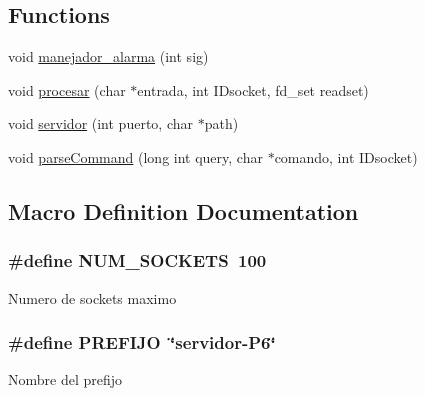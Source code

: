 \subsection*{Functions}
\begin{DoxyCompactItemize}
\item 
void \hyperlink{_g-2361-06-_p1-_server_8h_ad27ad83298aac3580deda730e80a62f0}{manejador\+\_\+alarma} (int sig)
\item 
void \hyperlink{_g-2361-06-_p1-_server_8h_a3053755c82b5168bea9d848b1284f3ca}{procesar} (char $\ast$entrada, int I\+Dsocket, fd\+\_\+set readset)
\item 
void \hyperlink{_g-2361-06-_p1-_server_8h_ae168ee6fdf31fd5ed7d49d45b89a65ed}{servidor} (int puerto, char $\ast$path)
\item 
void \hyperlink{_g-2361-06-_p1-_server_8h_ab7e145be74e8922987621cd01b8d446e}{parse\+Command} (long int query, char $\ast$comando, int I\+Dsocket)
\end{DoxyCompactItemize}


\subsection{Macro Definition Documentation}
\hypertarget{_g-2361-06-_p1-_server_8h_a1c803e4ececfb47d2791c9283c85eb00}{}
\subsubsection[{N\+U\+M\+\_\+\+S\+O\+C\+K\+E\+T\+S}]{\setlength{\rightskip}{0pt plus 5cm}\#define N\+U\+M\+\_\+\+S\+O\+C\+K\+E\+T\+S~100}\label{_g-2361-06-_p1-_server_8h_a1c803e4ececfb47d2791c9283c85eb00}
Numero de sockets maximo \hypertarget{_g-2361-06-_p1-_server_8h_a78c658ff923693099f7b621e7c351129}{}
\subsubsection[{P\+R\+E\+F\+I\+J\+O}]{\setlength{\rightskip}{0pt plus 5cm}\#define P\+R\+E\+F\+I\+J\+O~\char`\"{}servidor-\/P6\char`\"{}}\label{_g-2361-06-_p1-_server_8h_a78c658ff923693099f7b621e7c351129}
Nombre del prefijo \hypertarget{_g-2361-06-_p1-_server_8h_a70ed59adcb4159ac551058053e649640}{}
